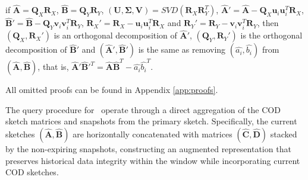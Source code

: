 \begin{lemma} \label{lem:fast-equivalent}
    if $\hat{\boldsymbol{A}}=\boldsymbol{Q}_X \boldsymbol{R}_X$, $\hat{\boldsymbol{B}}=\boldsymbol{Q}_Y\boldsymbol{R}_Y$, $(\boldsymbol{U},\boldsymbol{\Sigma},\boldsymbol{V}) = SVD(\boldsymbol{R}_X\boldsymbol{R}_Y^T)$, $\hat{\boldsymbol{A}}{'}= \hat{\boldsymbol{A}} - \boldsymbol{Q}_X\boldsymbol{u}_i\boldsymbol{u}_i^T\boldsymbol{R}_X$, $\hat{\boldsymbol{B}}{'} = \hat{\boldsymbol{B}} - \boldsymbol{Q}_Y\boldsymbol{v}_i\boldsymbol{v}_i^T\boldsymbol{R}_Y$, $\boldsymbol{R}_X' = \boldsymbol{R}_X - \boldsymbol{u}_i\boldsymbol{u}_i^T\boldsymbol{R}_X$ and $\boldsymbol{R}_Y' = \boldsymbol{R}_Y - \boldsymbol{v}_i\boldsymbol{v}_i^T\boldsymbol{R}_Y$, then $(\boldsymbol{Q}_X,\boldsymbol{R}_X')$ is an orthogonal decomposition of $\hat{\boldsymbol{A}}{'}$, $(\boldsymbol{Q}_Y,\boldsymbol{R}_Y')$ is the orthogonal decomposition of $\hat{\boldsymbol{B}}{'}$ and $(\hat{\boldsymbol{A}}{'}, \hat{\boldsymbol{B}}{'})$ is the same as removing $(\hat{a_i},\hat{b_i})$ from $(\hat{\boldsymbol{A}},\hat{\boldsymbol{B}})$, that is, $\hat{\boldsymbol{A}}{'}\hat{\boldsymbol{B}}{'}^T = \hat{\boldsymbol{A}}\hat{\boldsymbol{B}}^T - \hat{a_i}\hat{b_i}^T$.
\end{lemma}

All omitted proofs can be found in Appendix \ref{app:proofs}.



The query procedure for \oursolution\ operate through a direct aggregation of the COD sketch matrices and snapshots from the primary sketch. Specifically, the current sketches $(\hat{\boldsymbol{A}},\hat{\boldsymbol{B}})$ are horizontally concatenated with matrices $(\hat{\boldsymbol{C}},\hat{\boldsymbol{D}})$ stacked by the non-expiring snapshots, constructing an augmented representation that preserves historical data integrity within the window while incorporating current COD sketches.





